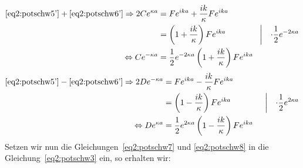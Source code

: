 \begin{align}
  \eqref{eq2:potschw5'} + \eqref{eq2:potschw6'}
  \Rightarrow 
   2Ce^{\kappa a} &= Fe^{ika}+ \frac{ik}{\kappa}Fe^{ika}
   \label{eq2:potschw7}\\ %
                 &= \left(1+\frac{ik}{\kappa}\right)Fe^{ika}
                      \qquad \qquad 
                      \left|\quad \cdot \frac{1}{2}e^{-2\kappa a}\right.\notag\\
  \Leftrightarrow 
  Ce^{-\kappa a} &= \frac{1}{2}e^{-2\kappa a}
                     \left(1+\frac{ik}{\kappa}\right)Fe^{ika}\notag
\end{align}
\begin{align}
  \eqref{eq2:potschw5'} - \eqref{eq2:potschw6'}
  \Rightarrow 
  2De^{-\kappa a} &= Fe^{ika}- \frac{ik}{\kappa}Fe^{ika}
  \label{eq2:potschw8} \\
                  &= \left(1-\frac{ik}{\kappa}\right)Fe^{ika}
                      \qquad \qquad 
                      \left|\quad \cdot \frac{1}{2}e^{2\kappa a}\right.\notag\\
  \Leftrightarrow 
  De^{\kappa a} &= \frac{1}{2}e^{2\kappa a}
                    \left(1-\frac{ik}{\kappa}\right)Fe^{ika}\notag
\end{align}
Setzen wir nun die Gleichungen~\eqref{eq2:potschw7} und \eqref{eq2:potschw8}
in die Gleichung~\eqref{eq2:potschw3} ein, so erhalten
wir:
